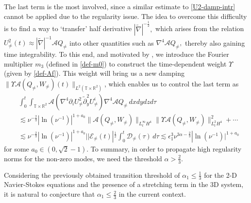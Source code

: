 \documentclass[11pt,reqno]{article}
\numberwithin{equation}{section}
\newcommand\R{{\mathbb R}}
\newcommand\T{{\mathbb T}}
\newcommand\D{{\mathcal D}}
\newcommand\E{{\mathcal E}}
\newcommand\A{\mathcal{A}}
\let\pa=\partial
\let\na=\nabla
\let\al=\alpha
\let\f=\frac
\let\ep=\epsilon
\begin{document}
The last term is the most involved, since a similar estimate to \eqref{U2-damp-intr} cannot be applied due to the regularity issue. The idea to overcome this difficulty is to find a way to `transfer' half derivative $|\tilde{\na}|^{-\f12},$ which arises from the relation $U_{\neq}^2(t)\approx |\tilde{\na}|^{-1}\A Q_{\neq}$
into other quantities such as $\nabla^4\A Q_{\not=},$ thereby also gaining time integrability. To this end, and motivated by \cite{Knobel-2025}, we introduce the Fourier multiplier $m_3$  (defined in \eqref{def-m0}) to construct the time-dependent weight $\varUpsilon$ (given by \eqref{def-Af}).
This weight will bring us a new damping $\|
\varUpsilon\A (Q_{\not=},W_{\not=})(t)\|_{L^2(\T\times\R^2)}$,  
which enables us to control the last term as
\begin{align*}
& 
	\int_0^t\int_{\T\times\R^2}
	\A(\nabla^4\pa_{i}U_{\not=}^2
	\tilde{\pa}_y^2U_{\not=}^i)
	\nabla^4\A Q_{\not=}\,dxdydzd\tau \\
	&\lesssim 
	\nu^{-\f23}|\ln(\nu^{-1})|^{1+a_0} \|\A(Q_{\not=},W_{\not=})\|_{L^\infty_t H^4}
	\big\|\varUpsilon\A( Q_{\not=},W_{\not=})\big\|_{L^2_t H^4}^2+\cdots
	\\
	&\lesssim \nu^{-\f23}|\ln(\nu^{-1})|^{1+a_0}| |\E_{\not=}(t)|^{\f12}\int_0^t\D_{\not=}(\tau)\,d\tau
	\lesssim  \ep_1^3\nu^{3\al-\f23}|\ln(\nu^{-1})|^{1+a_0}
\end{align*}
for some $a_0\in (0,\sqrt{2}-1).$ To summary, in order to propagate high regularity norms for the non-zero modes, we need the threshold $\alpha>\frac23.$


Considering the previously obtained transition threshold of $\alpha_1\leq \f13$ for the 2-D Navier-Stokes equations \cite{Bedrossian-Wang-2018, MZ, WZ-2023} and the presence of a stretching term in the 3D system, it is natural to conjecture that $\alpha_1\leq \f23$ in the current context.
\end{document}
